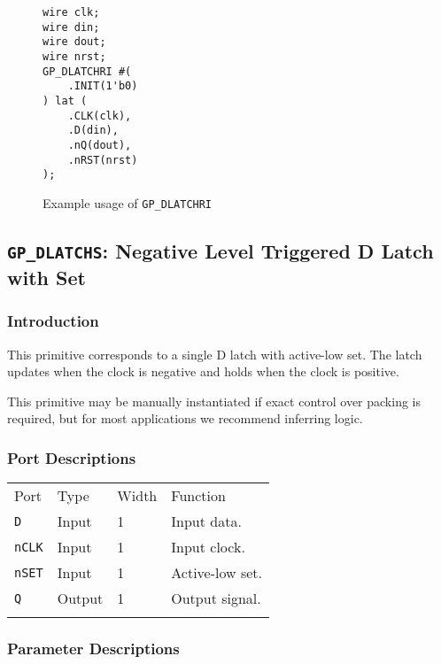 \documentclass[11pt]{article}
\newcommand{\tokenstyle}[1]{\texttt{#1}}
\newcommand{\whenstyle}[1]{{\fontseries{sb}\selectfont#1}}
\newcommand{\thinhline}{\Xhline{1\arrayrulewidth}}
\newcommand{\thickhline}{\Xhline{2.5\arrayrulewidth}}
\begin{document}
\begin{figure}[h]
\begin{lstlisting}
wire clk;
wire din;
wire dout;
wire nrst;
GP_DLATCHRI #(
	.INIT(1'b0)
) lat (
	.CLK(clk),
	.D(din),
	.nQ(dout),
	.nRST(nrst)
);
\end{lstlisting}
\caption{Example usage of \tokenstyle{GP\_DLATCHRI}}
\label{gp-dlatchri-example}
\end{figure}


\pagebreak
\subsection{\tokenstyle{GP\_DLATCHS}: Negative Level Triggered D Latch with Set}
\label{gp-latchs}

\subsubsection{Introduction}
This primitive corresponds to a single D latch with active-low set. The latch updates when the clock is negative and holds 
when the clock is positive.

This primitive may be manually instantiated if exact control over packing is required, but for most applications we
recommend inferring logic.

\subsubsection{Port Descriptions}

\begin{tabularx}{\textwidth}{lllX}
\thinhline
\whenstyle{Port} & \whenstyle{Type} & \whenstyle{Width} & \whenstyle{Function} \\
\thickhline
\tokenstyle{D} & Input & 1 & Input data. \\
\thinhline
\tokenstyle{nCLK} & Input & 1 & Input clock. \\
\thinhline
\tokenstyle{nSET} & Input & 1 & Active-low set. \\
\thinhline
\tokenstyle{Q} & Output & 1 & Output signal. \\
\thinhline
\end{tabularx}

\subsubsection{Parameter Descriptions}
\end{document}
